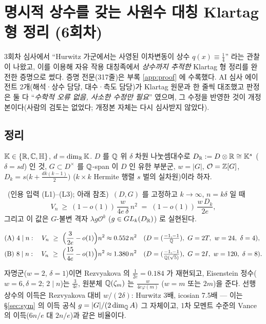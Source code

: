 \section{명시적 상수를 갖는 사원수 대칭 Klartag 형 정리 (6회차)}\label{sec:quat}

3회차 심사에서 ``Hurwitz 가군에서는 사영된 이차변동이 상수 $q(x)\equiv\tfrac14$'' 라는 관찰이 나왔고, 이를 이용해 자유 작용 대칭족에서 \emph{상수까지 추적한} Klartag 형 정리를 완전한 증명으로 썼다. 증명 전문(317줄)은 부록 \ref{app:proof} 에 수록했다. AI 심사 에이전트 2개(해석·상수 담당, 대수·측도 담당)가 Klartag 원문과 한 줄씩 대조했고 판정은 둘 다 ``\emph{수학적 오류 없음, 사소한 수정만 필요}'' 였으며, 그 수정을 반영한 것이 개정본이다(사람의 검토는 없었다; 개정본 자체는 다시 심사받지 않았다).

\subsection{정리}
$\mathbb K\in\{\mathbb{R},\mathbb{C},\mathbb{H}\}$, $d=\dim_{\mathbb{R}}\mathbb K$. $D$ 를 $\mathbb{Q}$ 위 $\delta$ 차원 나눗셈대수로 $D_{\mathbb{R}}:=D\otimes\mathbb{R}\cong\mathbb K^s$ ($\delta=sd$) 인 것, $G\subset D^\times$ 를 $\mathbb{Q}$-span 이 $D$ 인 유한 부분군, $w=|G|$, $\mathcal O=\mathbb{Z}[G]$, $D_k=s\big(k+\tfrac{dk(k-1)}2\big)$ ($k\times k$ Hermite 행렬 $s$ 벌의 실차원)이라 하자.
\begin{theorem}[틀 정리 C$'$]\label{thm:quatC}\tagPL\ (인용 입력 (L1)--(L3); 아래 참조)\
$(D,G)$ 를 고정하고 $k\to\infty$, $n=k\delta$ 일 때
\[
V_n\ \ge\ (1-o(1))\,\frac{w}{4e\,\delta}\,n^2\;=\;(1-o(1))\,\frac{w\,D_k}{2e},
\]
그리고 이 값은 $G$-불변 격자 $\lambda g\mathcal O^k$ ($g\in GL_k(D_{\mathbb{R}})$) 로 실현된다.
\end{theorem}
\begin{theorem}[Hurwitz 와 icosian]\label{thm:quatAB}\tagPL
\begin{align*}
&\text{(A) } 4\mid n:\quad V_n\ \ge\ \Big(\frac3{2e}-o(1)\Big)n^2\approx0.552\,n^2 &&(D=(\tfrac{-1,-1}{\Q}),\ G=2T,\ w=24,\ \delta=4),\\
&\text{(B) } 8\mid n:\quad V_n\ \ge\ \Big(\frac{15}{4e}-o(1)\Big)n^2\approx1.380\,n^2 &&(D=(\tfrac{-1,-1}{\Q(\sqrt5)}),\ G=2I,\ w=120,\ \delta=8).
\end{align*}
\end{theorem}
자명군($w=2$, $\delta=1$)이면 Rezvyakova 의 $\tfrac1{2e}=0.184$ 가 재현되고, Eisenstein 정수($w=6,\delta=2$; $2\mid n$)는 $\tfrac3{4e}$, 원분체 $\mathbb{Q}(\zeta_m)$ 는 $\tfrac{w}{4e\varphi(m)}$ ($w=m$ 또는 $2m$)을 준다. 선행 상수의 이득은 Rezvyakova 대비 $w/(2\delta)$: Hurwitz 3배, icosian 7.5배 --- 이는 \S\ref{sec:sym} 의 이득 공식 $g=|G|/(2\dim_{\mathbb{Q}} A)$ 그 자체이고, 1차 모멘트 수준의 Vance 의 이득($6n/e$ 대 $2n/e$)과 같은 비율이다.

